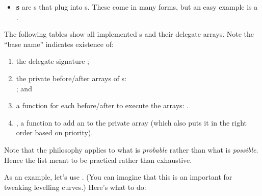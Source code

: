 \begin{itemize}
{\begin{center}
		\end{center}		 
		}
	\item{\textbf{s} are s that plug into s. These come in many forms, but an easy example is a . }
\end{itemize}


The following tables show all implemented s and their delegate arrays. Note the ``base name'' indicates existence of:

\begin{enumerate}
	\item{the delegate signature ;}
	\item{the private before/after arrays of s: \\; and}
	\item{a function for each before/after to execute the arrays: .}
	\item{, a function to add an  to the private array  (which also puts it in the right order based on priority).}
\end{enumerate}

\noindent Note that the philosophy applies to what is \textit{probable} rather than what is \textit{possible}. Hence the list meant to be practical rather than exhaustive.







As an example, let's use . (You can imagine that this is an important  for tweaking levelling curves.) Here's what to do:\\

